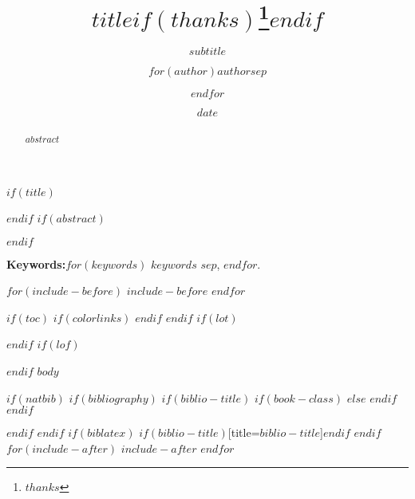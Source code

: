 \documentclass[$if(fontsize)$$fontsize$,$endif$$if(lang)$$babel-lang$,$endif$$if(papersize)$$papersize$paper,$endif$$for(classoption)$$classoption$$sep$,$endfor$]{$documentclass$}
\title{$title$$if(thanks)$\thanks{$thanks$}$endif$}
\subtitle{$subtitle$}
\author{$for(author)$$author$$sep$ \and $endfor$}
\institute{$for(institute)$$institute$$sep$ \and $endfor$}
\date{$date$}
\begin{document}
	$if(title)$
		\maketitle
	$endif$
	$if(abstract)$
		\begin{abstract}
			$abstract$
		\end{abstract}
	$endif$
	
	{\bfseries Keywords:}$for(keywords)$ $keywords$ $sep$, $endfor$.

	$for(include-before)$
		$include-before$
	$endfor$

	$if(toc)${
		$if(colorlinks)$
			\hypersetup{linkcolor=$if(toccolor)$$toccolor$$else$black$endif$}
		$endif$
		\setcounter{tocdepth}{$toc-depth$}
		\tableofcontents
	}
	$endif$
	$if(lot)$
		\listoftables
	$endif$
	$if(lof)$
		\listoffigures
	$endif$
	$body$

	$if(natbib)$
	$if(bibliography)$
	$if(biblio-title)$
	$if(book-class)$
		\renewcommand\bibname{$biblio-title$}
	$else$
		\renewcommand\refname{$biblio-title$}
	$endif$
	$endif$
	

	$endif$
	$endif$
	$if(biblatex)$
		\printbibliography$if(biblio-title)$[title=$biblio-title$]$endif$
	$endif$
	$for(include-after)$
		$include-after$
	$endfor$
\end{document}
